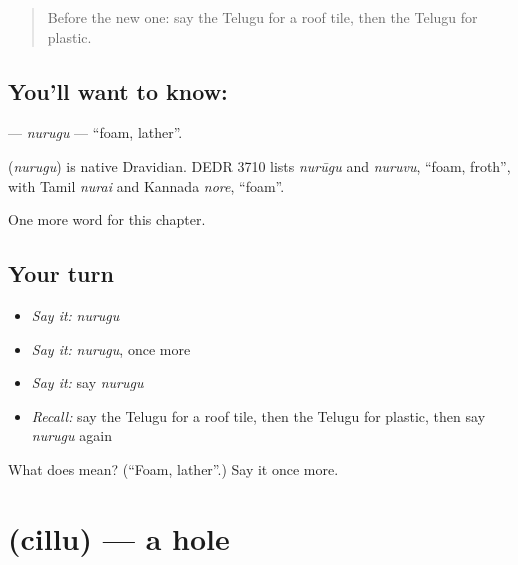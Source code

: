 \label{lesson:TE-C271-nurugu}



\begin{quote}
Before the new one: say the Telugu for a roof tile, then the Telugu for plastic.
\end{quote}

\subsection*{You'll want to know: }
\textbf{} — \emph{nurugu} — \textquotedblleft{}foam, lather\textquotedblright{}.

\begin{cousinweb}
\textbf{} (\emph{nurugu}) is native Dravidian. DEDR 3710 lists \emph{nurūgu} and \emph{nuruvu}, \textquotedblleft{}foam, froth\textquotedblright{}, with Tamil \emph{nurai} and Kannada \emph{nore}, \textquotedblleft{}foam\textquotedblright{}.
\end{cousinweb}

\begin{grammarlens}[title={What you've built}]
One more word for this chapter.
\end{grammarlens}

\subsection*{Your turn}
\begin{itemize}
\raggedright
  \item \emph{Say it:} \emph{nurugu}
  \item \emph{Say it:} \emph{nurugu}, once more
  \item \emph{Say it:} say \emph{nurugu}
  \item \emph{Recall:} say the Telugu for a roof tile, then the Telugu for plastic, then say \emph{nurugu} again
\end{itemize}

\begin{tcolorbox}[breakable,colback=teal!4,colframe=teal!35!black,title={Before you move on}]
What does  mean? (\textquotedblleft{}Foam, lather\textquotedblright{}.) Say it once more.
\end{tcolorbox}
\section[\texorpdfstring{\te{చిల్లు} (cillu)}{చిల్లు (cillu)}]{ (cillu) — a hole}

